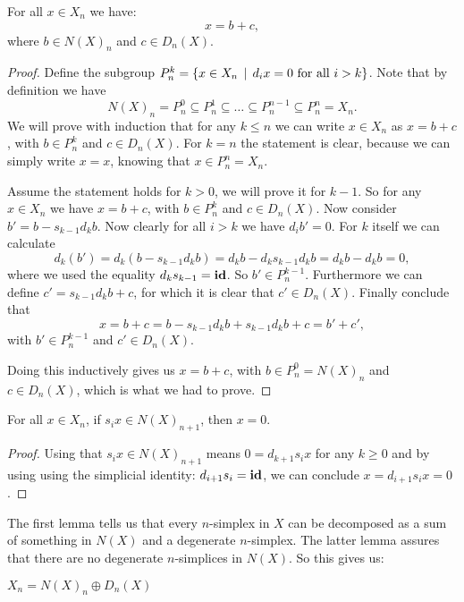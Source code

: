 \begin{lemma}
	\label{le:decomp1}
	For all $x \in X_n$ we have:
	$$ x = b + c,$$
	where $b \in N(X)_n$ and $c \in D_n(X)$.
\end{lemma}
\begin{proof}
	Define the subgroup $P_n^k = \{ x \in X_n \,\mid\, d_i x = 0 \text{ for all } i > k\}$. Note that by definition we have
	$$ N(X)_n = P_n^0 \subseteq P_n^1 \subseteq \ldots \subseteq P_n^{n-1} \subseteq P_n^n = X_n. $$
	We will prove with induction that for any $k \leq n$ we can write $x \in X_n$ as $x = b + c$, with $b \in P_n^k$ and $c \in D_n(X)$. For $k = n$ the statement is clear, because we can simply write $x = x$, knowing that $x \in P_n^n = X_n$.

	Assume the statement holds for $k > 0$, we will prove it for $k-1$. So for any $x \in X_n$ we have $x = b + c$, with $b \in P_n^k$ and $c \in D_n(X)$. Now consider $b' = b - s_{k-1} d_k b$. Now clearly for all $i > k$ we have $d_i b' = 0$. For $k$ itself we can calculate
	$$ d_k(b') = d_k(b - s_{k-1} d_k b) = d_k b - d_k s_{k-1} d_k b = d_k b - d_k b = 0, $$
	where we used the equality $d_k s_{k-1} = \mathbf{id}$. So $b' \in P_n^{k-1}$. Furthermore we can define $c' = s_{k-1} d_k b + c$, for which it is clear that $c' \in D_n(X)$. Finally conclude that
	$$ x = b + c = b - s_{k-1} d_k b + s_{k-1} d_k b + c = b' + c',$$
	with $b' \in P_n^{k-1}$ and $c' \in D_n(X)$.

	Doing this inductively gives us $x = b + c$, with $b \in P_n^0 = N(X)_n$ and $c \in D_n(X)$, which is what we had to prove.
\end{proof}
\begin{lemma}
	\label{le:decomp2}
	For all $x \in X_n$, if $s_i x \in N(X)_{n+1}$, then $x = 0$.
\end{lemma}
\begin{proof}
	Using that $s_i x \in N(X)_{n+1}$ means $0 = d_{k+1} s_i x$ for any $k \geq 0$ and by using using the simplicial identity: $d_{i+1} s_i = \mathbf{id}$, we can conclude $x = d_{i+1} s_i x = 0$.
\end{proof}

The first lemma tells us that every $n$-simplex in $X$ can be decomposed as a sum of something in $N(X)$ and a degenerate $n$-simplex. The latter lemma assures that there are no degenerate $n$-simplices in $N(X)$. So this gives us:

\begin{corollary}
	\label{cor:NandD}
	$X_n = N(X)_n \oplus D_n(X)$
\end{corollary}

